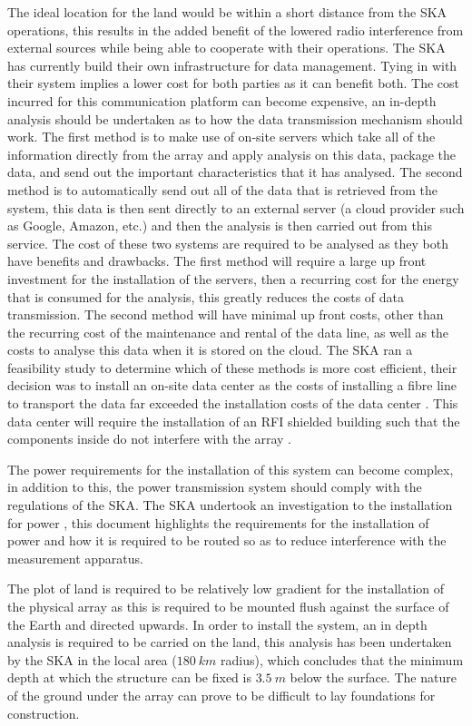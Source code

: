 \documentclass[11pt]{witseiepaper}
\begin{document}
\begin{bibunit}[witseie]
The ideal location for the land would be within a short distance from the SKA operations, this results in the added benefit of the lowered radio interference from external sources while being able to cooperate with their operations. 
The SKA has currently build their own infrastructure for data management. Tying in with their system implies a lower cost for both parties as it can benefit both. The cost incurred for this communication platform can become expensive, an in-depth analysis should be undertaken as to how the data transmission mechanism should work.
The first method is to make use of on-site servers which take all of the information directly from the array and apply analysis on this data, package the data, and send out the important characteristics that it has analysed. The second method is to automatically send out all of the data that is retrieved from the system, this data is then sent directly to an external server (a cloud provider such as Google, Amazon, etc.) and then the analysis is then carried out from this service.
The cost of these two systems are required to be analysed as they both have benefits and drawbacks.
The first method will require a large up front investment for the installation of the servers, then a recurring cost for the energy that is consumed for the analysis, this greatly reduces the costs of data transmission.
The second method will have minimal up front costs, other than the recurring cost of the maintenance and rental of the data line, as well as the costs to analyse this data when it is stored on the cloud.
The SKA ran a feasibility study to determine which of these methods is more cost efficient, their decision was to install an on-site data center as the costs of installing a fibre line to transport the data far exceeded the installation costs of the data center \cite[p.~17-18]{SKAFibre}.
This data center will require the installation of an RFI shielded building such that the components inside do not interfere with the array \cite[p.~18]{SKAFibre}.

The power requirements for the installation of this system can become complex, in addition to this, the power transmission system should comply with the regulations of the SKA. The SKA undertook an investigation to the installation for power \cite{SKAFibre}, this document highlights the requirements for the installation of power and how it is required to be routed so as to reduce interference with the measurement apparatus.


The plot of land is required to be relatively low gradient for the installation of the physical array as this is required to be mounted flush against the surface of the Earth and directed upwards.
In order to install the system, an in depth analysis is required to be carried on the land, this analysis has been undertaken by the SKA in the local area ($180~km$ radius)\cite[p.~95,98]{SKAFibre}, which concludes that the minimum depth at which the structure can be fixed is $3.5~m$ below the surface. The nature of the ground under the array can prove to be difficult to lay foundations for construction.


\end{bibunit}
\end{document}
